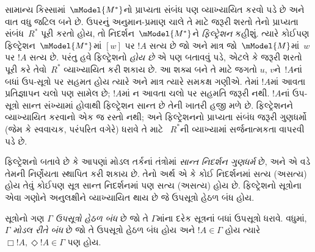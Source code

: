 
સામાન્ય કિસ્સામાં~$\mModel{M^*}$નો પ્રાપ્યતા સંબંધ પણ વ્યાખ્યાયિત
કરવો પડે છે અને વાત વધુ જટિલ બને છે. ઉપરનું અનુમાન-પ્રમાણ ચાલે
તે માટે જરૂરી શરતો તેનો પ્રાપ્યતા સંબંધ~$R^*$ પૂરી કરતો હોય,
તો નિદર્શન~$\mModel{M^*}$ને \emph{ફિલ્ટ્રેશન} કહીશું.
ત્યારે કોઈપણ ફિલ્ટ્રેશન~$\mModel{M^*}$માં $[w]$ પર $!A$
સત્ય છે જો અને માત્ર જો~$\mModel{M}$માં~$w$ પર $!A$ સત્ય છે.
પરંતુ હવે ફિલ્ટ્રેશનો \emph{હોય છે} એ પણ બતાવવું પડે, એટલે કે
જરૂરી શરતો પૂરી કરે તેવો~$R^*$ વ્યાખ્યાયિત કરી શકાય છે.
આ શક્ય બને તે માટે જગતો $u$, $v$ને~$!A$નાં બધાં
ઉપ-સૂત્રો પર સહમત હોય ત્યારે અને માત્ર ત્યારે સમકક્ષ ગણીએ.
તેમાં $!A$માં આવતા પ્રતિજ્ઞાપન ચલો પણ સામેલ છે; $!A$માં ન આવતા
ચલો પર સહમતિ જરૂરી નથી. $!A$નાં ઉપ-સૂત્રો સાન્ત સંખ્યામાં હોવાથી
ફિલ્ટ્રેશન સાન્ત છે તેની ખાતરી હજી મળે છે. ફિલ્ટ્રેશનને વ્યાખ્યાયિત
કરવાનો એક જ રસ્તો નથી; અને ફિલ્ટ્રેશનનો પ્રાપ્યતા સંબંધ જરૂરી
ગુણધર્મો (જેમ કે સ્વવાચક, પરંપરિત વગેરે) ધરાવે તે માટે
~$R^*$ની વ્યાખ્યામાં સર્જનાત્મકતા વાપરવી પડે છે.

\endgroup

\begingroup
\makeatletter{}\makeatother


\label{guunit:OLP-0452}


ફિલ્ટ્રેશનો બતાવે છે કે આપણાં મોડલ તર્કનાં તંત્રોમાં \emph{સાન્ત
નિદર્શન ગુણધર્મ} છે, અને એ વડે તેમની નિર્ણેયતા સ્થાપિત કરી શકાય
છે. તેનો અર્થ એ કે કોઈ નિદર્શનમાં સત્ય (અસત્ય) હોય તેવું કોઈપણ
સૂત્ર સાન્ત નિદર્શનમાં પણ સત્ય (અસત્ય) હોય છે.
ફિલ્ટ્રેશનો સૂત્રોના એવા ગણોને અનુલક્ષીને વ્યાખ્યાયિત થાય છે
જે ઉપસૂત્રો હેઠળ બંધ હોય.

\begin{defn}
  સૂત્રોનો ગણ $\Gamma$ \emph{ઉપસૂત્રો હેઠળ બંધ} છે જો તે
  $\Gamma$માંના દરેક સૂત્રનાં બધાં ઉપસૂત્રો ધરાવે.
  વધુમાં, $\Gamma$ \emph{મોડલ રીતે બંધ} છે જો તે ઉપસૂત્રો હેઠળ
  બંધ હોય અને $!A \in \Gamma$ હોય ત્યારે $\Box!A,
  \Diamond!A \in \Gamma$ પણ હોય.
\end{defn}


